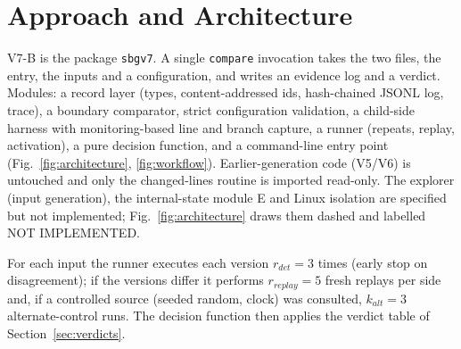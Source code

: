 \section{Approach and Architecture}\label{sec:approach}
V7-B is the package \texttt{sbgv7}. A single \texttt{compare} invocation takes the two files, the entry, the inputs and a configuration, and writes an evidence log and a verdict. Modules: a record layer (types, content-addressed ids, hash-chained JSONL log, trace), a boundary comparator, strict configuration validation, a child-side harness with monitoring-based line and branch capture, a runner (repeats, replay, activation), a pure decision function, and a command-line entry point (Fig.~\ref{fig:architecture}, \ref{fig:workflow}). Earlier-generation code (V5/V6) is untouched and only the changed-lines routine is imported read-only. The explorer (input generation), the internal-state module E and Linux isolation are specified but not implemented; Fig.~\ref{fig:architecture} draws them dashed and labelled NOT IMPLEMENTED.

For each input the runner executes each version $r_{det}=3$ times (early stop on disagreement); if the versions differ it performs $r_{replay}=5$ fresh replays per side and, if a controlled source (seeded random, clock) was consulted, $k_{alt}=3$ alternate-control runs. The decision function then applies the verdict table of Section~\ref{sec:verdicts}.
